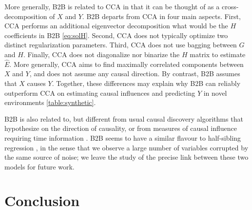 \documentclass{article}
\begin{document}
More generally, B2B is related to CCA \citep{cca_hotelling} in that it can be thought of as a cross-decomposition of $X$ and $Y$. B2B departs from CCA in four main aspects. First, CCA performs an additional eigenvector decomposition what would be the $H$ coefficients in B2B \eqref{eq:solH}. Second, CCA does not typically optimize two distinct regularization parameters. Third, CCA does not use bagging between $G$ and $H$. Finally, CCA does not diagonalize nor binarize the $H$ matrix to estimate $\hat E$. More generally, CCA aims to find maximally correlated components between $X$ and $Y$, and does not assume any causal direction. By contrast, B2B assumes that $X$ causes $Y$. Together, these differences may explain why B2B can reliably outperform CCA on estimating causal influences and predicting $Y$ in novel environments \ref{table:synthetic}.
%


B2B is also related to, but different from usual causal discovery algorithms \citep{peters2017elements} that hypothesize on the direction of causality, or from measures of causal influence requiring time information \citep{granger1969investigating, janzing2013quantifying}.
%
B2B seems to have a similar flavour to half-sibling regression \citep{scholkopf2016modeling}, in the sense that we observe a large number of variables corrupted by the same source of noise; we leave the study of the precise link between these two models for future work.


\section{Conclusion}

\end{document}
